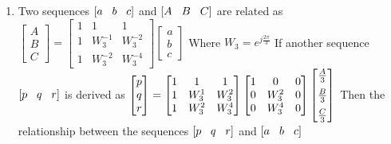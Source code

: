 \documentclass[journal,12pt,twocolumn]{IEEEtran}
\begin{document}
\begin{enumerate}
\item Two sequences $[a\hspace{3mm}b\hspace{3mm}c]$ and $[A \hspace{3mm}B \hspace{3mm}C]$ are related as  \newline $\begin{bmatrix}
A\\
B \\
C
\end{bmatrix}=\begin{bmatrix}
1 & 1 & 1\\
1 & W^{-1}_3 & W^{-2}_3 \\
1 & W^{-2}_3 & W^{-4}_3
\end{bmatrix}\begin{bmatrix}
a\\
b \\
c
\end{bmatrix} $ Where $W_3=e^{j\frac{2\pi}{3}}$ \newline If another sequence $[p\hspace{3mm}q\hspace{3mm}r]$ is derived as \newline
$\begin{bmatrix}
p\\
q \\
r
\end{bmatrix}=\begin{bmatrix}
1 & 1 & 1\\
1 & W^{1}_3 & W^{2}_3 \\
1 & W^{2}_3 & W^{4}_3
\end{bmatrix} \begin{bmatrix}
1 & 0 & 0\\
0 & W^{2}_3 & 0 \\
0 & W^{4}_3 & 0
\end{bmatrix}\begin{bmatrix}
\frac{A}{3} \vspace{2mm}\\
\frac{B}{3} \vspace{2mm}\\
\frac{C}{3}
\end{bmatrix} $ 
\newline Then the relationship between the sequences $[p\hspace{3mm}q\hspace{3mm}r]$ and $[a\hspace{3mm}b\hspace{3mm}c]$\\
\setlength\itemsep{1em}
\begin{enumerate}



\end{enumerate}
\end{enumerate}
\end{document}
